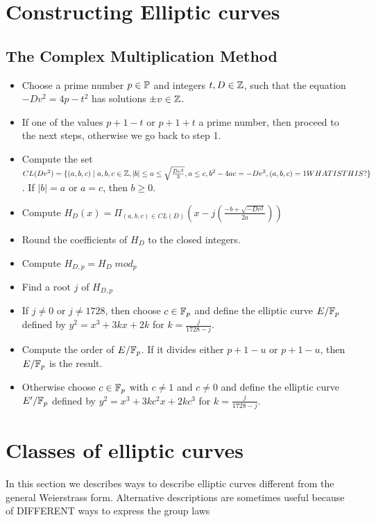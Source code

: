 \section{Constructing Elliptic curves}
\subsection{The Complex Multiplication Method}
\begin{itemize}
\item Choose a prime number $p\in\mathbb{P}$ and integers $t,D\in\mathbb{Z}$, such that the equation $-Dv^2 = 4p - t^2$ has solutions $\pm v \in \mathbb{Z}$.
\item If one of the values $p+1-t$ or $p+1+t$ a prime number, then proceed to the next steps, otherwise we go back to step 1.
\item Compute the set $CL(Dv^2)=\{(a,b,c)\;|\; a,b,c\in\mathbb{Z}, |b|\leq a \leq \sqrt{\frac{Dv^2}{3}},a\leq c, b^2-4ac=-Dv^2, (a,b,c)=1WHATISTHIS?\}$. If $|b|=a$ or $a=c$, then $b\geq 0$.
\item Compute $H_D(x)=\Pi_{(a,b,c)\in CL(D)} (x-j(\frac{-b+\sqrt{-Dv^2}}{2a}))$
\item Round the coefficients of $H_D$ to the closed integers.
\item Compute $H_{D,p} =H_D \; mod_p$
\item Find a root $j$ of $H_{D,p}$ 
\item If $j\neq 0$ or $j\neq 1728$, then choose $c\in \mathbb{F}_p$ and define the elliptic curve $E/\mathbb{F}_p$ defined by $y^2 = x^3 + 3kx+2k$ for $k= \frac{j}{1728-j}$.
\item Compute the order of $E/\mathbb{F}_p$. If it divides either $p+1-u$ or $p+1-u$, then $E/\mathbb{F}_p$ is the result.
\item Otherwise choose $c\in \mathbb{F}_p$ with $c\neq 1$ and $c\neq 0$ and define the elliptic curve $E'/\mathbb{F}_p$ defined by $y^2 = x^3 + 3kc^2x+2kc^3$ for $k= \frac{j}{1728-j}$.
\end{itemize}
\section{Classes of elliptic curves}
In this section we describes ways to describe elliptic curves different from the general Weierstrass form. Alternative descriptions are sometimes useful because of DIFFERENT ways to express the group laws


